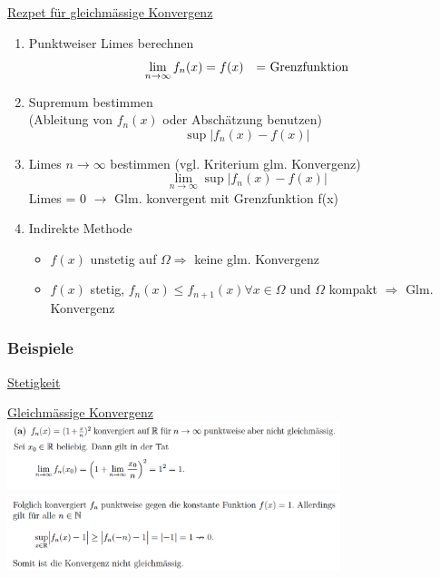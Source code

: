 \documentclass[6pt]{article}
\begin{document}
\begin{multicols*}{3}
\vspace{2mm}
\underline{Rezpet f{\"u}r gleichm{\"a}ssige Konvergenz} 
\begin{enumerate}[label=(\roman*)]
	\item Punktweiser Limes berechnen
				\[
						\lim_{n\rightarrow\infty}f_n(x) = f(x) \text{\quad = Grenzfunktion}
				\]
	\item Supremum bestimmen \\
				(Ableitung von $f_n(x)$  oder Absch{\"a}tzung benutzen)
				\[
						\sup|f_n(x) - f(x)|
				\]
	\item Limes $n \to \infty$ bestimmen (vgl. Kriterium glm. Konvergenz)
				\[
						\lim_{n\rightarrow\infty} \sup|f_n(x) - f(x)|
				\]
				Limes = 0 $\rightarrow$ Glm. konvergent mit Grenzfunktion f(x)
	\item Indirekte Methode \\
				\begin{itemize}
					\item $f(x)$ unstetig  auf $\Omega \Rightarrow$ keine glm. Konvergenz	
					\item $f(x)$ stetig, $f_n(x) \leq f_{n+1}(x) \forall x \in \Omega $ und $\Omega$ kompakt $\Rightarrow$ Glm. Konvergenz
				\end{itemize}

\end{enumerate}


\subsubsection*{Beispiele}

	\underline{Stetigkeit}
	\vspace{133mm}
	
	\underline{Gleichm{\"a}ssige Konvergenz} \vspace{2mm}\\
		\includegraphics[width=275pt]{images/glm_konvergenz1}
		\includegraphics[width=275pt]{images/glm_konvergenz2}






\end{multicols*}
\end{document}
